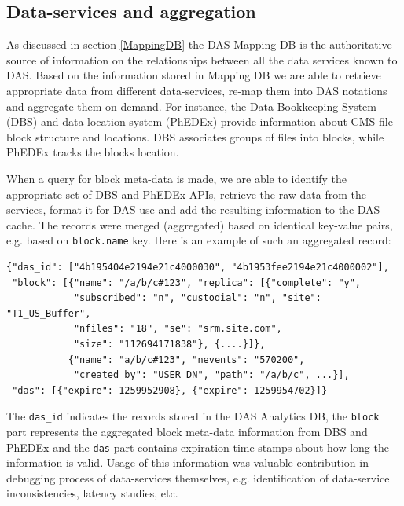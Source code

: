 \documentclass[1p,times]{elsarticle}
\begin{document}
\subsection{Data-services and aggregation}
As discussed in section \ref{MappingDB} the DAS Mapping DB 
is the authoritative source of information on the relationships between 
all the data services known to DAS.
Based on the information stored in Mapping DB we are able to 
retrieve appropriate data from different data-services, re-map them into 
DAS notations and aggregate them on demand. For instance, the Data 
Bookkeeping System (DBS) \cite{DBS} and data location system (PhEDEx) \cite{PhEDEx}
provide information about CMS file block structure and locations.
DBS associates groups of files into blocks, while PhEDEx tracks the blocks
location. 

When a query for block meta-data is made, we are
able to identify the appropriate set of 
DBS and PhEDEx APIs, retrieve the raw data from the services, format it
for DAS use and add the resulting information to the DAS cache. The records
were merged (aggregated) based on identical key-value pairs, e.g.
based on \verb+block.name+ key. Here is an example of such an aggregated record:
\begin{verbatim}
{"das_id": ["4b195404e2194e21c4000030", "4b1953fee2194e21c4000002"], 
 "block": [{"name": "/a/b/c#123", "replica": [{"complete": "y", 
            "subscribed": "n", "custodial": "n", "site": "T1_US_Buffer", 
            "nfiles": "18", "se": "srm.site.com", 
            "size": "112694171838"}, {....}]},
           {"name": "a/b/c#123", "nevents": "570200", 
            "created_by": "USER_DN", "path": "/a/b/c", ...}],
 "das": [{"expire": 1259952908}, {"expire": 1259954702}]}
\end{verbatim}
The \verb+das_id+ indicates the records stored in the DAS Analytics DB,
the \verb+block+ part represents the aggregated block meta-data information from DBS
and PhEDEx and the \verb+das+ part contains expiration time stamps
about how long the information is valid.
Usage of this information was valuable contribution in debugging process of
data-services themselves, e.g. identification of data-service inconsistencies, 
latency studies, etc.
\end{document}

